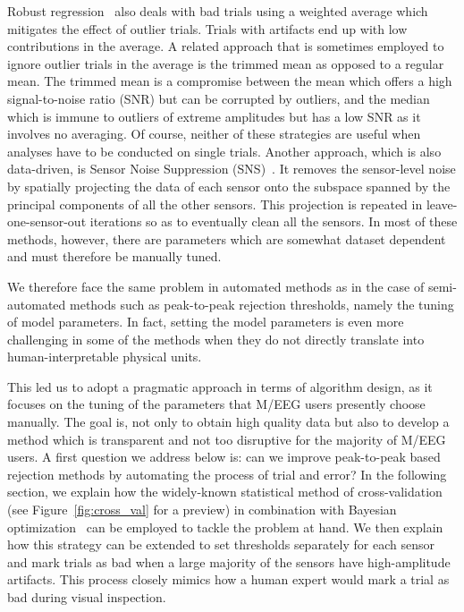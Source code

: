 Robust regression~\citep{diedrichsen2005detecting} also deals with bad trials using a weighted average which mitigates the effect of outlier trials. Trials with artifacts end up with low contributions in the average. A related approach that is sometimes employed to ignore outlier trials in the average is the trimmed mean as opposed to a regular mean. The trimmed mean is a compromise between the mean which offers a high signal-to-noise ratio (SNR) but can be corrupted by outliers, and the median which is immune to outliers of extreme amplitudes but has a low SNR as it involves no averaging. Of course, neither of these strategies are useful when analyses have to be conducted on single trials. Another approach, which is also data-driven, is Sensor Noise Suppression (SNS)~\citep{de2008sensor}. It removes the sensor-level noise by spatially projecting the data of each sensor onto the subspace spanned by the principal components of all the other sensors. This projection is repeated in leave-one-sensor-out iterations so as to eventually clean all the sensors. In most of these methods, however, there are parameters which are somewhat dataset dependent and must therefore be manually tuned.

We therefore face the same problem in automated methods as in the case of semi-automated methods such as peak-to-peak rejection thresholds, namely the tuning of model parameters. In fact, setting the model parameters is even more challenging in some of the methods when they do not directly translate into human-interpretable physical units.

This led us to adopt a pragmatic approach in terms of algorithm design, as it focuses on the tuning of the parameters that M/EEG users presently choose manually. The goal is, not only to obtain high quality data but also to develop a method which is transparent and not too disruptive for the majority of M/EEG users. A first question we address below is: can we improve peak-to-peak based rejection methods by automating the process of trial and error? In the following section, we explain how the widely-known statistical method of cross-validation (see Figure~\ref{fig:cross_val} for a preview) in combination with Bayesian optimization~\citep{snoek2012practical, bergstra2011algorithms} can be employed to tackle the problem at hand. We then explain how this strategy can be extended to set thresholds separately for each sensor and mark trials as bad when a large majority of the sensors have high-amplitude artifacts. This process closely mimics how a human expert would mark a trial as bad during visual inspection. 

